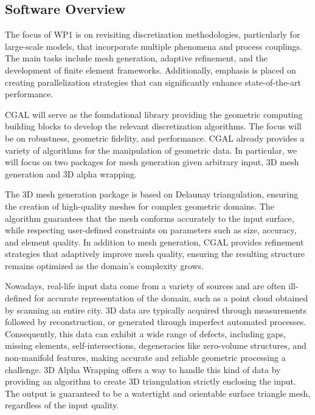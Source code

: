 \subsection{Software Overview}
\label{sec:WP1:CGAL:summary}


The focus of WP1 is on revisiting discretization methodologies, particularly for large-scale models,
that incorporate multiple phenomena and process couplings. The main tasks include mesh generation, adaptive refinement, 
and the development of finite element frameworks. Additionally, emphasis is placed on creating parallelization 
strategies that can significantly enhance state-of-the-art performance. 

CGAL will serve as the foundational library providing the geometric computing building blocks to develop the 
relevant discretization algorithms. The focus will be on robustness, geometric fidelity, and performance. 
CGAL already provides a variety of algorithms for the manipulation of geometric data.
In particular, we will focus on two packages for mesh generation given arbitrary input, 3D mesh generation and 3D alpha wrapping.

The 3D mesh generation package is based on Delaunay triangulation, ensuring the creation of high-quality meshes for complex geometric domains. 
The algorithm guarantees that the mesh conforms accurately to the input surface, while respecting user-defined constraints on parameters 
such as size, accuracy, and element quality. In addition to mesh generation, CGAL provides refinement strategies that adaptively improve 
mesh quality, ensuring the resulting structure remains optimized as the domain's complexity grows.



Nowadays, real-life input data come from a variety of sources and are often ill-defined for accurate representation of the domain, 
such as a point cloud obtained by scanning an entire city. 3D data are typically acquired through measurements followed by reconstruction, 
or generated through imperfect automated processes. Consequently, this data can exhibit a wide range of defects, including gaps, 
missing elements, self-intersections, degeneracies like zero-volume structures, and non-manifold features, making accurate 
and reliable geometric processing a challenge. 3D Alpha Wrapping offers a way to handle this kind of data by providing an algorithm 
to create 3D triangulation strictly enclosing the input. The output is guaranteed to be a watertight and orientable surface triangle mesh, 
regardless of the input quality.


